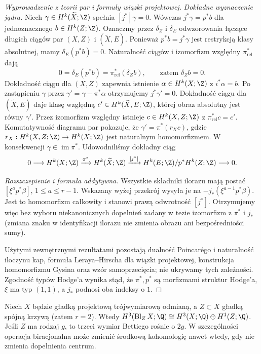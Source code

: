 \begin{proof}[Wyprowadzenie z teorii par i formuły wiązki projektowej]
\emph{Dokładne wyznaczenie jądra.}
Niech $\gamma\in H^k(\widetilde X;\Z)$
spełnia $[j^*]\gamma=0$.
Wówczas $j^*\gamma=p^*b$ dla jednoznacznego
$b\in H^k(Z;\Z)$.
Oznaczmy przez $\delta_Z$ i $\delta_E$
odwzorowania łączące długich ciągów par
$(X,Z)$ i $(\widetilde X,E)$.
Ponieważ $p^*b=j^*\gamma$ jest restrykcją
klasy absolutnej, mamy $\delta_E(p^*b)=0$.
Naturalność ciągów i izomorfizm względny
$\pi_{\mathrm{rel}}^*$ dają
\[
 0=\delta_E(p^*b)=\pi_{\mathrm{rel}}^*(\delta_Zb),
 \qquad\text{zatem }\delta_Zb=0.
\]
Dokładność ciągu dla $(X,Z)$ zapewnia
istnienie $\alpha\in H^k(X;\Z)$ z
$i^*\alpha=b$.
Po zastąpieniu $\gamma$ przez
$\gamma'=\gamma-\pi^*\alpha$ otrzymujemy
$j^*\gamma'=0$.
Dokładność ciągu dla $(\widetilde X,E)$
daje klasę względną
$c'\in H^k(\widetilde X,E;\Z)$,
której obraz absolutny jest równy $\gamma'$.
Przez izomorfizm względny istnieje
$c\in H^k(X,Z;\Z)$ z
$\pi_{\mathrm{rel}}^*c=c'$.
Komutatywność diagramu par pokazuje, że
$\gamma'=\pi^*(r_Xc)$, gdzie
$r_X:H^k(X,Z;\Z)\to H^k(X;\Z)$
jest naturalnym homomorfizmem.
W konsekwencji $\gamma\in\operatorname{im}\pi^*$.
Udowodniliśmy dokładny ciąg
\[
0\longrightarrow H^k(X;\Z)\xrightarrow{\pi^*}
H^k(\widetilde X;\Z)\xrightarrow{[j^*]}
H^k(E;\Z)/p^*H^k(Z;\Z)\longrightarrow0.
\]

\emph{Rozszczepienie i formuła addytywna.}
Wszystkie składniki ilorazu mają postać
$[\xi^ap^*\beta]$, $1\le a\le r-1$.
Wskazany wyżej przekrój wysyła je na
$-j_*(\xi^{a-1}p^*\beta)$.
Jest to homomorfizm całkowity i stanowi
prawą odwrotność $[j^*]$.
Otrzymujemy więc bez wyboru niekanonicznych
dopełnień zadany w tezie izomorfizm z
$\pi^*$ i $j_*$ (zmiana znaku w identyfikacji
ilorazu nie zmienia obrazu ani bezpośredniości sumy).

Użytymi zewnętrznymi rezultatami pozostają
dualność Poincarégo i naturalność iloczynu kap,
formuła Leraya--Hirscha dla wiązki projektowej,
konstrukcja homomorfizmu Gysina oraz wzór
samoprzecięcia; nie ukrywamy tych zależności.
Zgodność typów Hodge'a wynika stąd, że $\pi^*,p^*$
są morfizmami struktur Hodge'a, $\xi$ ma typ $(1,1)$,
a $j_*$ podnosi oba indeksy o $1$.
\end{proof}
\begin{przyklad}
Niech $X$ będzie gładką projektową trójwymiarową odmianą,
a $Z\subset X$ gładką spójną krzywą (zatem $r=2$).
Wtedy $H^3(\operatorname{Bl}_Z X;\Q)
\cong H^3(X;\Q)\oplus H^1(Z;\Q)$.
Jeśli $Z$ ma rodzaj $g$, to trzeci wymiar Bettiego rośnie o $2g$.
W szczególności operacja biracjonalna może zmienić środkową
kohomologię nawet wtedy, gdy nie zmienia dopełnienia centrum.
\end{przyklad}

